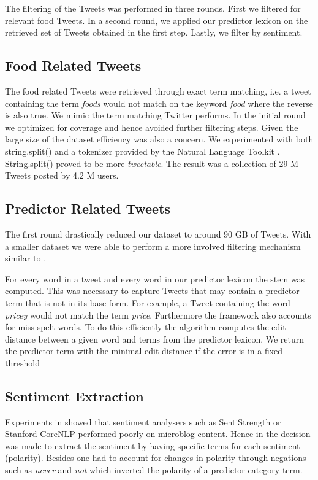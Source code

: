 The filtering of the Tweets was performed in three rounds. First we filtered for relevant food Tweets. In a second round, we applied our predictor lexicon on the retrieved set of Tweets obtained in the first step. Lastly, we filter by sentiment. 

\subsection{Food Related Tweets} 

The food related Tweets were retrieved through exact term matching, i.e. a tweet containing the term \emph{foods} would not match on the keyword \emph {food} where the reverse is also true. We mimic the term matching Twitter performs. In the initial round we optimized for coverage and hence avoided further filtering steps. Given the large size of the dataset efficiency was also a concern. We experimented with both string.split() and a tokenizer provided by the Natural Language Toolkit \cite{Loper2002}. String.split() proved to be more \emph{tweetable}. The result was a collection of 29 M Tweets posted by 4.2 M users. 

\subsection{Predictor Related Tweets}

The first round  drastically reduced our dataset to around 90 GB of Tweets. With a smaller dataset we were able to perform a more involved filtering mechanism similar to \cite{hum14}. 

For every word in a tweet and every word in our predictor lexicon the stem was computed. This was necessary to capture Tweets that may contain a predictor term that is not in its base form. For example, a Tweet containing the word \emph{pricey} would not match the term \emph{price}. Furthermore the framework also accounts for miss spelt words. To do this efficiently the algorithm computes the edit distance between a given word and terms from the predictor lexicon. We return the  predictor term with the minimal edit distance if the error is in a fixed threshold 

\subsection{Sentiment Extraction}

Experiments in \cite{hum14} showed that sentiment analysers such as SentiStrength \cite{sent10} or Stanford CoreNLP \cite{stanford2011} performed  poorly on microblog content. Hence in \cite{hum14} the decision was made to extract the sentiment by having specific terms for each sentiment (polarity). Besides one had to account for changes in polarity through negations such as \emph{never} and \emph{not} which inverted the polarity of a predictor category term. 

